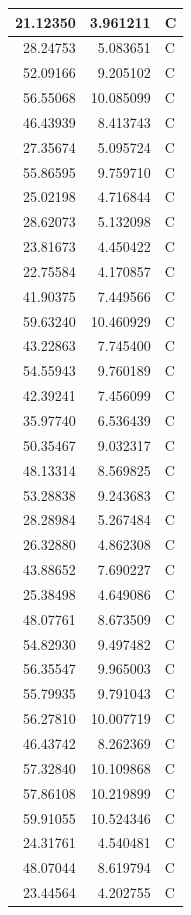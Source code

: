\documentclass[
  letterpaper,
  DIV=11,
  numbers=noendperiod]{scrartcl}
\begin{document}
\begin{table}
\begin{tabular}[t]{r|r|l}
\hline
21.12350 & 3.961211 & C\\
\hline
28.24753 & 5.083651 & C\\
\hline
52.09166 & 9.205102 & C\\
\hline
56.55068 & 10.085099 & C\\
\hline
46.43939 & 8.413743 & C\\
\hline
27.35674 & 5.095724 & C\\
\hline
55.86595 & 9.759710 & C\\
\hline
25.02198 & 4.716844 & C\\
\hline
28.62073 & 5.132098 & C\\
\hline
23.81673 & 4.450422 & C\\
\hline
22.75584 & 4.170857 & C\\
\hline
41.90375 & 7.449566 & C\\
\hline
59.63240 & 10.460929 & C\\
\hline
43.22863 & 7.745400 & C\\
\hline
54.55943 & 9.760189 & C\\
\hline
42.39241 & 7.456099 & C\\
\hline
35.97740 & 6.536439 & C\\
\hline
50.35467 & 9.032317 & C\\
\hline
48.13314 & 8.569825 & C\\
\hline
53.28838 & 9.243683 & C\\
\hline
28.28984 & 5.267484 & C\\
\hline
26.32880 & 4.862308 & C\\
\hline
43.88652 & 7.690227 & C\\
\hline
25.38498 & 4.649086 & C\\
\hline
48.07761 & 8.673509 & C\\
\hline
54.82930 & 9.497482 & C\\
\hline
56.35547 & 9.965003 & C\\
\hline
55.79935 & 9.791043 & C\\
\hline
56.27810 & 10.007719 & C\\
\hline
46.43742 & 8.262369 & C\\
\hline
57.32840 & 10.109868 & C\\
\hline
57.86108 & 10.219899 & C\\
\hline
59.91055 & 10.524346 & C\\
\hline
24.31761 & 4.540481 & C\\
\hline
48.07044 & 8.619794 & C\\
\hline
23.44564 & 4.202755 & C\\

\end{tabular}
\end{table}
\end{document}
